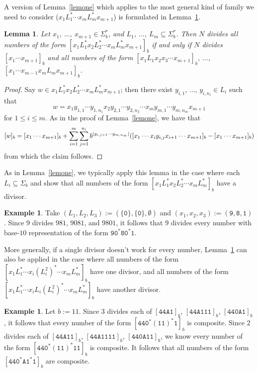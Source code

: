 \documentclass[12pt]{article}
\DeclarePairedDelimiter\abs{\lvert}{\rvert}
\theoremstyle{plain}
\newtheorem{lemma}[theorem]{Lemma}
\theoremstyle{definition}
\newtheorem{example}[theorem]{Example}
\theoremstyle{remark}
\newcommand{\0}{\mathtt{0}}
\newcommand{\1}{\mathtt{1}}
\newcommand{\2}{\mathtt{2}}
\newcommand{\3}{\mathtt{3}}
\newcommand{\4}{\mathtt{4}}
\newcommand{\5}{\mathtt{5}}
\newcommand{\6}{\mathtt{6}}
\newcommand{\7}{\mathtt{7}}
\newcommand{\8}{\mathtt{8}}
\newcommand{\9}{\mathtt{9}}
\newcommand{\A}{\mathtt{A}}
\begin{document}
A version of Lemma~\ref{lemone} which applies to the most general kind 
of family we need to consider ($x_1L_1^*\dotsm x_mL_m^*x_{m+1}$) %
is formulated in Lemma~\ref{lemtwo}.

\begin{lemma}\label{lemtwo}
Let $x_1$, $\dotsc$, $x_{m+1}\in \Sigma^*_b$, and $L_1$, $\dotsc$, 
$L_m\subseteq\Sigma^*_b$.  Then
$N$ divides all numbers of the form $[x_1L_1^*x_2L_2^*\dotsm x_mL_m^*x_{m+1}]_b$
if and only if
$N$ divides $[x_1\dotsm x_{m+1}]_b$ and all numbers of the form 
$[x_1L_1x_2x_3\dotsm x_{m+1}]_b$, $\dotsc$, $[x_1\dotsm x_{m-1}x_mL_mx_{m+1}]_b$.
\end{lemma}
\begin{proof}
Say $w\in x_1L_1^*x_2L_2^*\dotsm x_mL_m^*x_{m+1}$; then there exist
$y_{i,1}$, $\dotsc$, $y_{i,n_i}\in L_i$ such that
\[ w = x_1y_{1,1}\dotsm y_{1,n_1}x_2y_{2,1}\dotsm y_{2,n_2}\dotsm x_m y_{m,1}\dotsm y_{m,n_m}x_{m+1} \]
for $1\leq i\leq m$.
As in the proof of Lemma~\ref{lemone}, we have that
\[ [w]_b = [x_1\dotsm x_{m+1}]_b + \sum_{i=1}^m\sum_{j=1}^{n_i} b^{\abs{y_{i,j+1}\dotsm y_{m,n_m}}}([x_1\dotsm x_i y_{i,j} x_{i+1}\dotsm x_{m+1}]_b-[x_1\dotsm x_{m+1}]_b) \]
from which the claim follows.
\end{proof}
As in Lemma~\ref{lemone}, we typically apply this lemma in the case 
where each $L_i\subseteq\Sigma_b$ and show that all numbers of the 
form $[x_1L_1^*x_2L_2^*\dotsm x_mL_m^*]_b$ have a divisor.
\begin{example}
Take $(L_1, L_2, L_3) := (\{ \0 \},\{\0\},\emptyset)$ and $(x_1,x_2, x_3) := (\9, \8, \1)$.
Since $9$ divides $981$, $9081$, and $9801$, it follows that $9$ 
divides every number with base-$10$ representation
of the form $\9\0^*\8\0^*\1$.
\end{example}

More generally, if a single divisor doesn't work for every number, 
Lemma~\ref{lemtwo} can also be applied in the case where all numbers 
of the form $[x_1L_1^*\dotsm x_i(L_i^2)^*\dotsm x_mL_m^*]_b$ have one
divisor, and all numbers of the form 
$[x_1L_1^*\dotsm x_iL_i(L_i^2)^*\dotsm x_mL_m^*]_b$ have another divisor.
\begin{example}
Let $b := 11$.
Since $3$ divides each of $[\4\4\A\1]_b$,
$[\4\4\A\1\1\1]_b$,
$[\4\4\0\A\1]_b$ ,
it follows that
every number of the form $[\4\4\0^*(\1\1)^*\1]_b$ is composite.
Since $2$ divides each of $[\4\4\A\1\1]_b$,
$[\4\4\A\1\1\1\1]_b$, $[\4\4\0\A\1\1]_b$, we know
every number of the form $[\4\4\0^*(\1\1)^*\1\1]_b$ is composite.
It follows that all numbers of the form $[\4\4\0^*\A\1^*\1]_b$ are composite.
\end{example}
\end{document}
